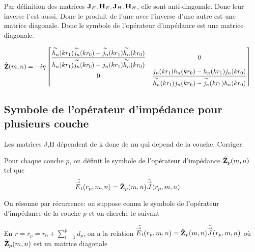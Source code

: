         Par définition des matrices \(\mJ_E,\mH_E,\mJ_H,\mH_H\), elle sont anti-diagonale. Donc leur inverse l'est aussi. Donc le produit de l'une avec l'inverse d'une autre est une matrice diagonale. Donc le symbole de l'opérateur d'impédance est une matrice diagonale.

        \begin{equation}
            \hat{\mZ}(m,n) = -i\eta
            \begin{bmatrix}
                \frac
                {\tilde{h_n}(kr_1)\tilde{j_n}(kr_0)-\tilde{j_n}(kr_1)\tilde{h_n}(kr_0)}
                {{h_n}(kr_1)\tilde{j_n}(kr_0)-{j_n}(kr_1)\tilde{h_n}(kr_0)} & 0
                \\
                0 & \frac
                {{j_n}(kr_1){h_n}(kr_0)-{h_n}(kr_1){j_n}(kr_0)}
                {\tilde{h_n}(kr_1){j_n}(kr_0)-\tilde{j_n}(kr_1){h_n}(kr_0)}
            \end{bmatrix}
        \end{equation}

    \subsection{Symbole de l'opérateur d'impédance pour plusieurs couche}

        \begin{TODO}
            Les matrices J,H dépendent de k donc de nu qui depend de la couche. Corriger.
        \end{TODO}

        \begin{figure}[!hbt]
          \centering
          \begin{tikzpicture}
            
          \end{tikzpicture}
        \end{figure}


        \begin{defn}
          Pour chaque couche \(p\), on définit le symbole de l'opérateur d'impédance \(\hat{\mZ}_p(m,n)\) tel que 
          \[
              \hat{\vE_t}(r_p,m,n) = \hat{\mZ}_p(m,n)\hat{\vJ}(r_p,m,n)
          \]
        \end{defn}

        On résonne par récurrence: on suppose connu le symbole de l'opérateur d'impédance de la couche \(p\) et on cherche le suivant

        En \(r=r_{p}=r_0+\sum_{i=1}^p d_p\), on a la relation \( \hat{\vE_t}(r_p,m,n) = \hat{\mZ}_p(m,n)\hat{\vJ}(r_p,m,n)\) où \(\hat{\mZ}_p(m,n)\) est un matrice diagonale

